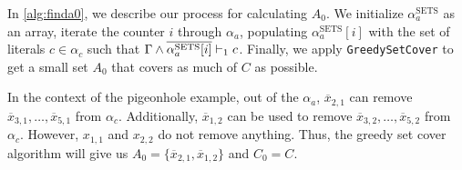 In \autoref{alg:finda0}, we describe our process for calculating $A_0$. 
We initialize $\alpha_a^\mathrm{SETS}$ as an array, iterate the counter
$i$ through $\alpha_a$, populating $\alpha_a^\mathrm{SETS}[i]$ with the set of literals
$c \in \alpha_c$ such that $\Gamma \land \overline{\alpha_a^\mathrm{SETS}[i]} \vdash_1 c$. Finally, we apply
\texttt{GreedySetCover} to get a small set $A_0$ that covers as much of $C$ as possible.

In the context of the pigeonhole example, out of the $\alpha_a$,
$\overline{x}_{2, 1}$ can remove $\overline{x}_{3, 1}, \ldots, \overline{x}_{5,
1}$ from $\alpha_c$. Additionally, $\overline{x}_{1, 2}$ can be used to remove
$\overline{x}_{3, 2}, \ldots, \overline{x}_{5, 2}$ from $\alpha_c$. However,
$x_{1, 1}$ and $x_{2, 2}$ do not remove anything. Thus, the greedy set cover
algorithm will give us $A_0 = \{\overline{x}_{2, 1}, \overline{x}_{1, 2}\}$ and
$C_0 = C$.




